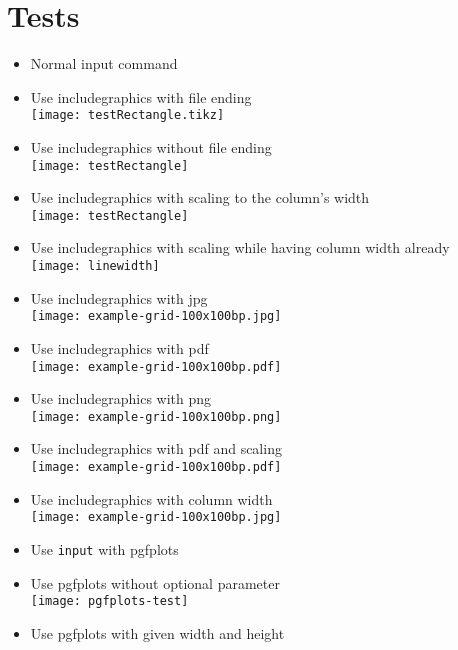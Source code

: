 \documentclass[twocolumn]{article}
\begin{document}
	\section*{Tests}
	\begin{itemize}
		\item Normal input command\\%
		\item Use includegraphics with file ending\\%
			\texttt{[image: testRectangle.tikz]}%
		\item Use includegraphics without file ending\\%
			\texttt{[image: testRectangle]}%
		\item Use includegraphics with scaling to the column's width\\%
			\texttt{[image: testRectangle]}%
		\item Use includegraphics with scaling while having column width already\\%
			\texttt{[image: linewidth]}%
		\item Use includegraphics with jpg\\%
			\texttt{[image: example-grid-100x100bp.jpg]}%
		\item Use includegraphics with pdf\\%
			\texttt{[image: example-grid-100x100bp.pdf]}%
		\item Use includegraphics with png\\%
			\texttt{[image: example-grid-100x100bp.png]}%
		\item Use includegraphics with pdf and scaling\\%
			\texttt{[image: example-grid-100x100bp.pdf]}%
		\item Use includegraphics with column width\\%
			\texttt{[image: example-grid-100x100bp.jpg]}%
		\item Use \texttt{input} with pgfplots\\%
		\item Use pgfplots without optional parameter\\%
			\texttt{[image: pgfplots-test]}%
		\item Use pgfplots with given width and height\\%

\end{itemize}
\end{document}
